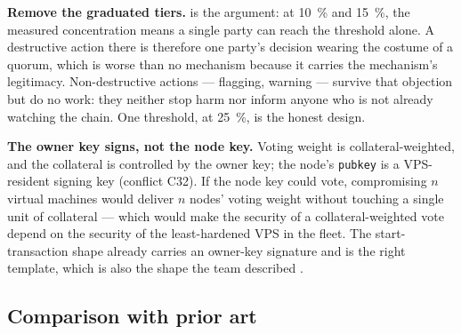 \textbf{Remove the graduated tiers.}  is the argument: at \SI{10}{\percent} and
\SI{15}{\percent}, the measured concentration means a single party can reach the threshold alone. A
destructive action there is therefore one party's decision wearing the costume of a quorum, which is
worse than no mechanism because it carries the mechanism's legitimacy. Non-destructive actions ---
flagging, warning --- survive that objection but do no work: they neither stop harm nor inform anyone
who is not already watching the chain. One threshold, at \SI{25}{\percent}, is the honest design.

\textbf{The owner key signs, not the node key.} Voting weight is collateral-weighted, and the
collateral is controlled by the owner key; the node's \texttt{pubkey} is a VPS-resident signing key
(conflict C32). If the node key could vote, compromising $n$ virtual machines would deliver $n$
nodes' voting weight without touching a single unit of collateral --- which would make the security
of a collateral-weighted vote depend on the security of the least-hardened VPS in the fleet. The
start-transaction shape  already carries an
owner-key signature and is the right template, which is also the shape the team described
.

\subsection{Comparison with prior art}
\label{sec:23:priorart}
\label{sec:23:related}

